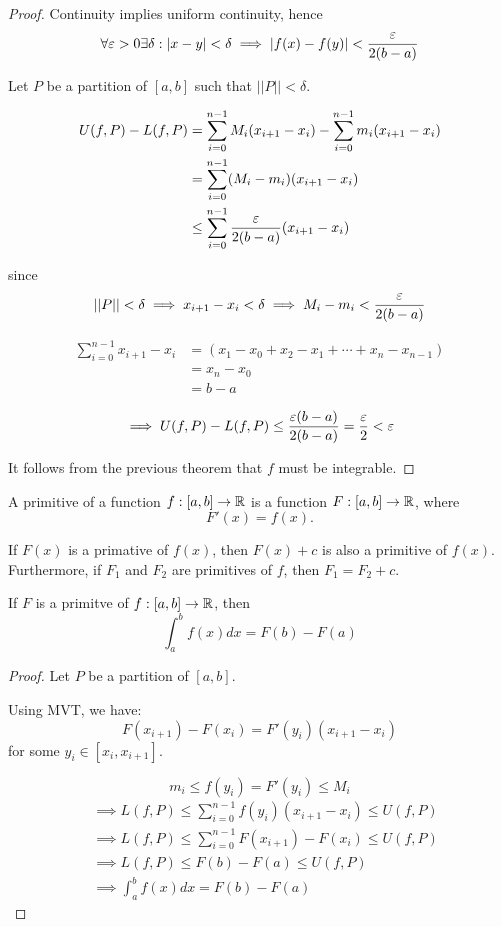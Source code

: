\documentclass[a4paper,10pt]{article}
\begin{document}
\begin{proof}
	Continuity implies uniform continuity, hence
	\[
		\forall \varepsilon > 0 \exists \delta : |x-y| < \delta
		\implies |f(x)-f(y)| < \frac{\varepsilon}{2(b-a)}
	\]

	Let $P$ be a partition of $[a,b]$ such that $||P|| < \delta$.

	\begin{align*}
		U(f,P) - L(f,P)
		&= \sum_{i=0}^{n-1} M_i (x_{i+1} - x_i) - \sum_{i=0}^{n-1} m_i (x_{i+1} - x_i) \\
		&= \sum_{i=0}^{n-1} (M_i - m_i)(x_{i+1} - x_i) \\
		&\leq \sum_{i=0}^{n-1} \frac{\varepsilon}{2(b-a)} (x_{i+1} - x_i)
	\end{align*}

	since
	\[
		||P|| < \delta \implies x_{i+1} - x_i < \delta
		\implies M_i - m_i < \frac{\varepsilon}{2(b-a)}
	\]

	\begin{align*}
		\sum_{i=0}^{n-1} x_{i+1} - x_i
		&= (x_1 - x_0 + x_2 - x_1 + \cdots + x_n - x_{n-1}) \\
		&= x_n - x_0 \\
		&= b - a
	\end{align*}

	\[
		\implies U(f,P) - L(f,P) \leq \frac{\varepsilon(b-a)}{2(b-a)}
		= \frac{\varepsilon}{2} < \varepsilon
	\]

	It follows from the previous theorem that $f$ must be integrable.

\end{proof}

\begin{defn}[Primtive]
	A primitive of a function $f:[a,b] \to \mathbb{R}$ is a function $F:[a,b] \to \mathbb{R}$, where
	\[ F'(x) = f(x). \]
\end{defn}

\begin{rem}
	If $F(x)$ is a primative of $f(x)$, then $F(x) + c$ is also a primitive of $f(x)$.
	Furthermore, if $F_1$ and $F_2$ are primitives of $f$, then $F_1 = F_2 + c$.
\end{rem}

\begin{thm}
	If $F$ is a primitve of $f:[a,b] \to \mathbb{R}$, then
	\[ \int_a^b f(x) dx = F(b) - F(a) \]
\end{thm}

\begin{proof}
	Let $P$ be a partition of $[a,b]$.

	Using MVT, we have:
	\[ F(x_{i+1}) - F(x_i) = F'(y_i)(x_{i+1} - x_i) \]
	for some $y_i \in [x_i, x_{i+1}]$.

	\[ m_i \leq f(y_i) = F'(y_i) \leq M_i \]
	\begin{align*}
		&\implies L(f,P) \leq \sum_{i=0}^{n-1} f(y_i)(x_{i+1}-x_i) \leq U(f,P) \\
		&\implies L(f,P) \leq \sum_{i=0}^{n-1} F(x_{i+1}) - F(x_i) \leq U(f,P) \\
		&\implies L(f,P) \leq F(b) - F(a) \leq U(f,P) \\
		&\implies \int_a^b f(x) dx = F(b) - F(a)
	\end{align*}
\end{proof}
\end{document}
